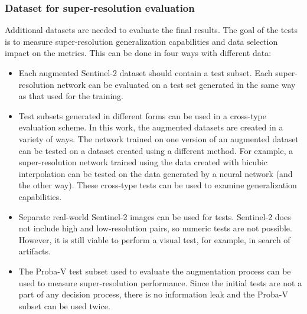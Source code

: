 \subsubsection{Dataset for super-resolution evaluation}
Additional datasets are needed to evaluate the final results.
The goal of the tests is to measure super-resolution generalization capabilities and data selection impact on the metrics.
This can be done in four ways with different data:
\begin{itemize}
	\item Each augmented Sentinel-2 dataset should contain a test subset. Each super-resolution network can be evaluated on a test set generated in the same way as that used for the training.
	\item Test subsets generated in different forms can be used in a cross-type evaluation scheme. In this work, the augmented datasets are created in a variety of ways. The network trained on one version of an augmented dataset can be tested on a dataset created using a different method. For example, a super-resolution network trained using the data created with bicubic interpolation can be tested on the data generated by a neural network (and the other way). These cross-type tests can be used to examine generalization capabilities.
	\item Separate real-world Sentinel-2 images can be used for tests. Sentinel-2 does not include high and low-resolution pairs, so numeric tests are not possible. However, it is still viable to perform a visual test, for example, in search of artifacts.
	\item The Proba-V test subset used to evaluate the augmentation process can be used to measure super-resolution performance. Since the initial tests are not a part of any decision process, there is no information leak and the Proba-V subset can be used twice.
\end{itemize}


